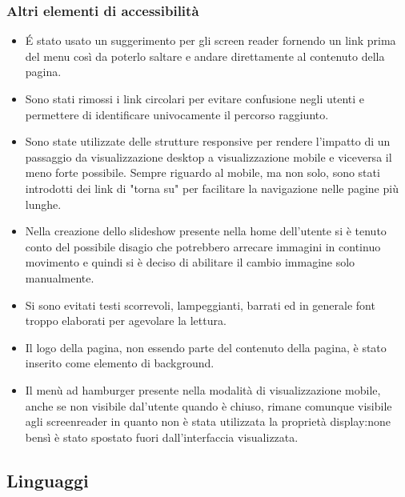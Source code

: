 \documentclass{article}
\begin{document}
			\subsubsection{Altri elementi di accessibilità}
			\begin{itemize}
				\item \'E stato usato un suggerimento per gli screen reader fornendo un link prima del menu così da poterlo saltare e andare direttamente al contenuto della pagina. 
				\item Sono stati rimossi i link circolari per evitare confusione negli utenti e permettere di identificare univocamente il percorso raggiunto.
				\item Sono state utilizzate delle strutture responsive per rendere l'impatto di un passaggio da visualizzazione desktop a visualizzazione mobile e viceversa il meno forte possibile. Sempre riguardo al mobile, ma non solo, sono stati introdotti dei link di "torna su" per facilitare la navigazione nelle pagine più lunghe.
				\item Nella creazione dello slideshow presente nella home dell'utente si è tenuto conto del possibile disagio che potrebbero arrecare immagini in continuo movimento e quindi si è deciso di abilitare il cambio immagine solo manualmente.
				\item Si sono evitati testi scorrevoli, lampeggianti, barrati ed in generale font troppo elaborati per agevolare la lettura.
				\item Il logo della pagina, non essendo parte del contenuto della pagina, è stato inserito come elemento di background.
				\item Il menù ad hamburger presente nella modalità di visualizzazione mobile, anche se non visibile dal'utente quando è chiuso, rimane comunque visibile agli screenreader in quanto non è stata utilizzata la proprietà display:none bensì è stato spostato fuori dall'interfaccia visualizzata. 
			\end{itemize}
		
		\subsection{Linguaggi}
			
\end{document}
